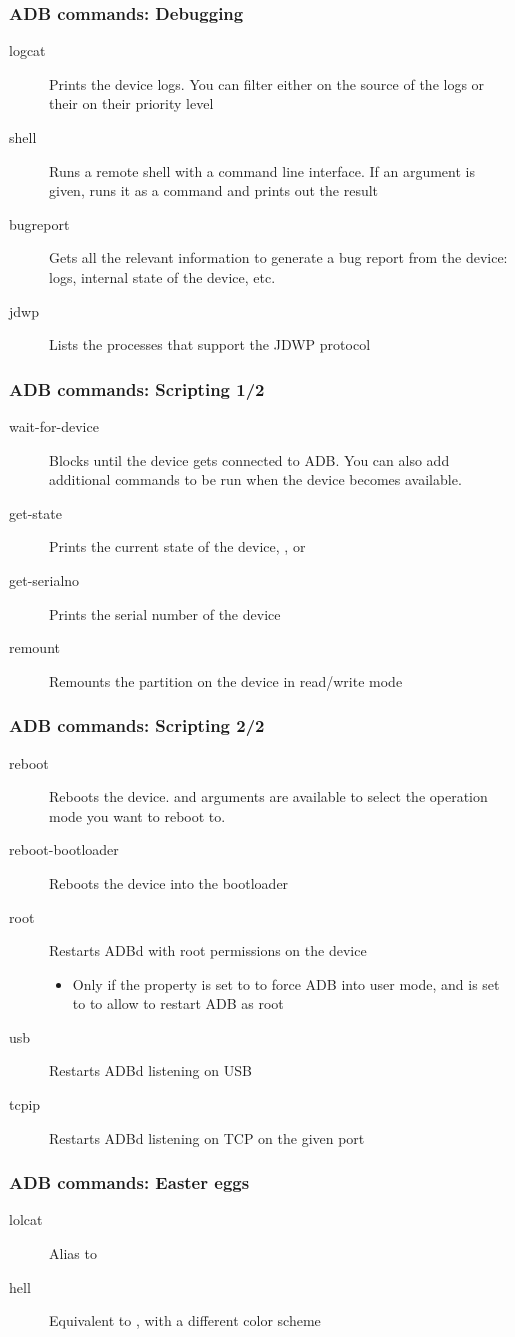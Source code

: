 \begin{frame}
  \frametitle{ADB commands: Debugging}
  \begin{description}
  \item[logcat] Prints the device logs. You can filter either on
    the source of the logs or their on their priority level
  \item[shell] Runs a remote shell with a command line interface. If an
    argument is given, runs it as a command and prints out the result
  \item[bugreport] Gets all the relevant information to generate a
    bug report from the device: logs, internal state of the device, etc.
  \item[jdwp] Lists the processes that support the JDWP protocol
  \end{description}
\end{frame}

\begin{frame}
  \frametitle{ADB commands: Scripting 1/2}
  \begin{description}
  \item[wait-for-device] Blocks until the device gets connected to
    ADB. You can also add additional commands to
    be run when the device becomes available.
  \item[get-state] Prints the current state of the device,
    ,  or 
  \item[get-serialno] Prints the serial number of the device
  \item[remount] Remounts the  partition on the device
    in read/write mode
  \end{description}
\end{frame}

\begin{frame}
  \frametitle{ADB commands: Scripting 2/2}
  \begin{description}
  \item[reboot] Reboots the device.  and
     arguments are available to select the operation
    mode you want to reboot to.
  \item[reboot-bootloader] Reboots the device into the bootloader
  \item[root] Restarts ADBd with root permissions on the device
    \begin{itemize}
    \item Only if the  property is set to 
      to force ADB into user mode, and  is set
      to  to allow to restart ADB as root
    \end{itemize}
  \item[usb] Restarts ADBd listening on USB
  \item[tcpip] Restarts ADBd listening on TCP on the given port
  \end{description}
\end{frame}

\begin{frame}
  \frametitle{ADB commands: Easter eggs}
  \begin{description}
  \item[lolcat] Alias to  
  \item[hell] Equivalent to , with a different
    color scheme
  \end{description}
\end{frame}
